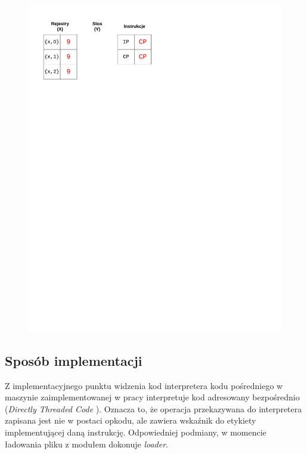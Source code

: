 \begin{figure}
\begin{multicols}{2}
\vspace{-4mm}
\begin{Figure}
 \centering
 \includegraphics[scale=0.65, clip, trim=10mm 215mm 110mm 10mm]{interpreter_max_8}
\label{fig:max8}
\end{Figure}
\end{multicols}
\end{figure}

\subsection{Sposób implementacji}
\label{sub:interpreterImplementacja}

Z implementacyjnego punktu widzenia kod interpretera kodu pośredniego w maszynie zaimplementowanej w pracy interpretuje kod adresowany bezpośrednio (\emph{Directly Threaded Code} \cite{Ertl}). Oznacza to, że operacja przekazywana do interpretera zapisana jest nie w postaci opkodu, ale zawiera wskaźnik do etykiety implementującej daną instrukcję. Odpowiedniej podmiany, w momencie ładowania pliku z modułem dokonuje \emph{loader}.

